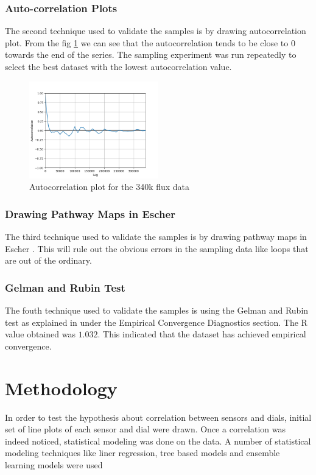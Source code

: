 \documentclass[12pt,chapterheads]{ucsd}
\begin{document}
\subsection{Auto-correlation Plots}
The second technique used to validate the samples is by drawing autocorrelation plot. From the fig \ref{fig:acp} we can see that the autocorrelation tends to be close to 0 towards the end of the series. The sampling experiment was run repeatedly to select the best dataset with the lowest autocorrelation value.

\begin{figure}[h] 
\centering
\includegraphics[width=0.5\textwidth]{acp_330k}
\caption[Autocorrelation plot]
{Autocorrelation plot for the 340k flux data}
\label{fig:acp}
\end{figure}

\subsection{Drawing Pathway Maps in Escher}
The third technique used to validate the samples is by drawing pathway maps in Escher \cite{10.1371/journal.pcbi.1004321}. This will rule out the obvious errors in the sampling data like loops that are out of the ordinary. 

\subsection{Gelman and Rubin Test}
The fouth technique used to validate the samples is using the Gelman and Rubin test as explained in \cite{10.1371/journal.pone.0086587} under the Empirical Convergence Diagnostics section. The R value obtained was $1.032$. This indicated that the dataset has achieved empirical convergence. 


\chapter{Methodology}\label{chap:method}
In order to test the hypothesis about correlation between sensors and dials,
initial set of line plots of each sensor and dial were drawn. Once a correlation was indeed noticed, statistical modeling was done on the data. A number of statistical modeling techniques like liner regression, tree based models and ensemble learning models were used 
\end{document}
